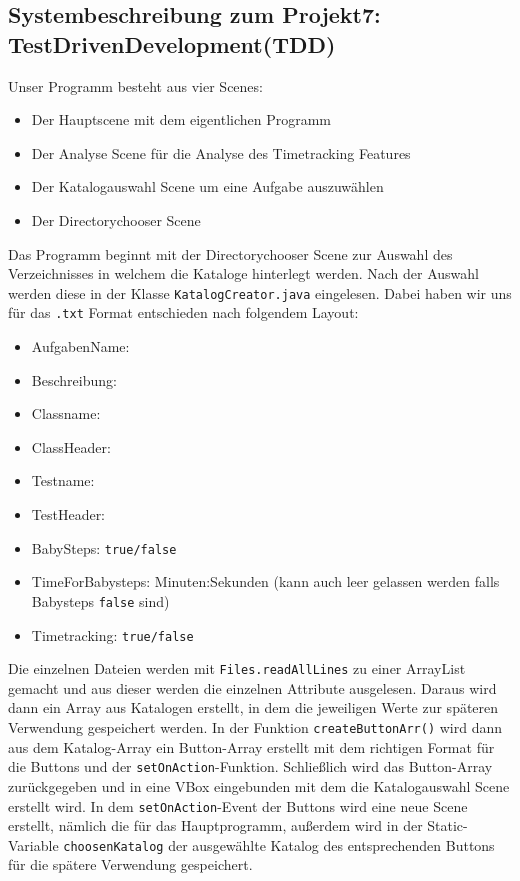 \documentclass[10pt]{article}
\begin{document}
\begin{center}

\section*{Systembeschreibung zum Projekt7: TestDrivenDevelopment(TDD)}

\end{center}
\bigskip
Unser Programm besteht aus vier Scenes:
\medskip
\begin{itemize}

\item Der Hauptscene mit dem eigentlichen Programm
\item Der Analyse Scene für die Analyse des Timetracking Features
\item Der Katalogauswahl Scene um eine Aufgabe auszuwählen
\item Der Directorychooser Scene

\end{itemize}
\medskip
Das Programm beginnt mit der Directorychooser Scene zur Auswahl des Verzeichnisses in welchem die Kataloge hinterlegt werden. Nach der Auswahl werden diese in der Klasse \verb+KatalogCreator.java+ eingelesen. Dabei haben wir uns für das \verb+.txt+ Format entschieden nach folgendem Layout:
\begin{itemize}

\item[] AufgabenName:

\item[] Beschreibung:

\item[] Classname:

\item[] ClassHeader:

\item[] Testname:

\item[] TestHeader:

\item[]BabySteps: \verb+true/false+
\item[] TimeForBabysteps: Minuten:Sekunden (kann auch leer gelassen werden falls Babysteps \verb+false+ sind)
\item[] Timetracking: \verb+true/false+
\end{itemize}
\medskip
Die einzelnen Dateien werden mit \verb+Files.readAllLines+ zu einer ArrayList gemacht und aus dieser werden die einzelnen Attribute ausgelesen. Daraus wird dann ein Array aus Katalogen erstellt, in dem die jeweiligen Werte zur späteren Verwendung gespeichert werden. In der Funktion \verb+createButtonArr()+ wird dann aus dem Katalog-Array ein Button-Array erstellt mit dem richtigen Format für die Buttons und der \verb+setOnAction+-Funktion. Schließlich wird das Button-Array zurückgegeben und in eine VBox eingebunden mit dem die Katalogauswahl Scene erstellt wird. In dem \verb+setOnAction+-Event der Buttons wird eine neue Scene erstellt, nämlich die für das Hauptprogramm, außerdem wird in der Static-Variable \verb+choosenKatalog+ der ausgewählte Katalog des entsprechenden Buttons für die spätere Verwendung gespeichert.
\end{document}
